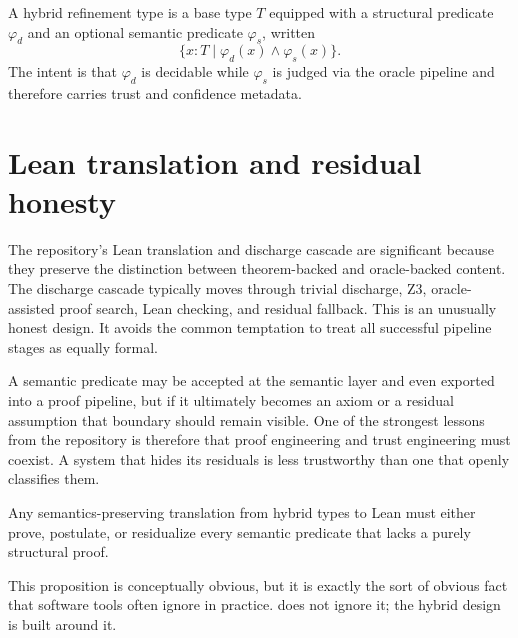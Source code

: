 \begin{definition}
A hybrid refinement type is a base type $T$ equipped with a structural predicate
$\varphi_d$ and an optional semantic predicate $\varphi_s$, written
\[
  \{x : T \mid \varphi_d(x) \land \varphi_s(x)\}.
\]
The intent is that $\varphi_d$ is decidable while $\varphi_s$ is judged via the oracle
pipeline and therefore carries trust and confidence metadata.
\end{definition}

\section*{Lean translation and residual honesty}
The repository's Lean translation and discharge cascade are significant because they
preserve the distinction between theorem-backed and oracle-backed content. The discharge
cascade typically moves through trivial discharge, Z3, oracle-assisted proof search,
Lean checking, and residual fallback. This is an unusually honest design. It avoids the
common temptation to treat all successful pipeline stages as equally formal.

A semantic predicate may be accepted at the semantic layer and even exported into a proof
pipeline, but if it ultimately becomes an axiom or a residual assumption that boundary
should remain visible. One of the strongest lessons from the repository is therefore that
proof engineering and trust engineering must coexist. A system that hides its residuals is
less trustworthy than one that openly classifies them.

\begin{proposition}
Any semantics-preserving translation from hybrid types to Lean must either prove,
postulate, or residualize every semantic predicate that lacks a purely structural proof.
\end{proposition}

This proposition is conceptually obvious, but it is exactly the sort of obvious fact that
software tools often ignore in practice. \DepPy{} does not ignore it; the hybrid design is
built around it.
